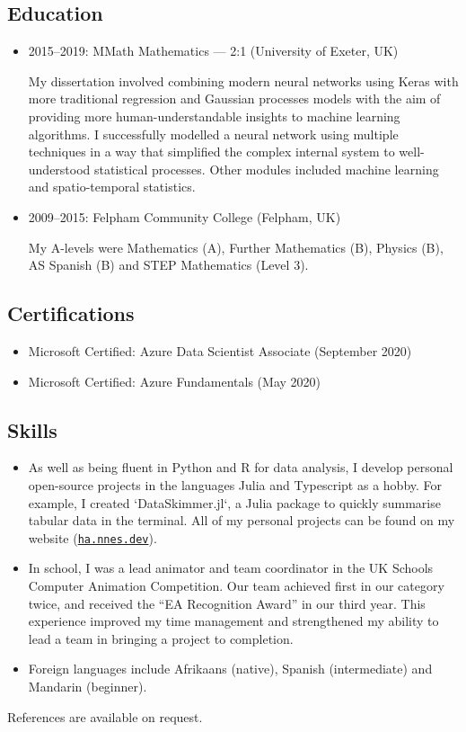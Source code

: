 \documentclass[11pt, a4paper]{article}
\begin{document}
\subsection*{Education}

\begin{itemize} 
	\item 2015--2019: MMath Mathematics --- 2:1 (University of Exeter, UK)

	My dissertation involved combining modern neural networks using Keras with more traditional regression and Gaussian processes models with the aim of providing more human-understandable insights to machine learning algorithms.
	I successfully modelled a neural network using multiple techniques in a way that simplified the complex internal system to well-understood statistical processes.
	Other modules included machine learning and spatio-temporal statistics.

	\item 2009--2015: Felpham Community College (Felpham, UK)

	My A-levels were Mathematics (A), Further Mathematics (B), Physics (B), AS Spanish (B) and STEP Mathematics (Level 3).
\end{itemize}

\subsection*{Certifications}

\begin{itemize}
\item Microsoft Certified: Azure Data Scientist Associate (September 2020)

\item Microsoft Certified: Azure Fundamentals (May 2020)
\end{itemize}

\subsection*{Skills}

\begin{itemize}
	\item As well as being fluent in Python and R for data analysis, I develop personal open-source projects in the languages Julia and Typescript as a hobby.
	For example, I created `DataSkimmer.jl`, a Julia package to quickly summarise tabular data in the terminal.
	All of my personal projects can be found on my website (\href{https://ha.nnes.dev/}{\nolinkurl{ha.nnes.dev}}).
	
	\item In school, I was a lead animator and team coordinator in the UK Schools Computer Animation Competition.
	Our team achieved first in our category twice, and received the \enquote{EA Recognition Award} in our third year.
	This experience improved my time management and strengthened my ability to lead a team in bringing a project to completion.

	\item Foreign languages include Afrikaans (native), Spanish (intermediate) and Mandarin (beginner).
\end{itemize}

\noindent References are available on request.
\end{document}
